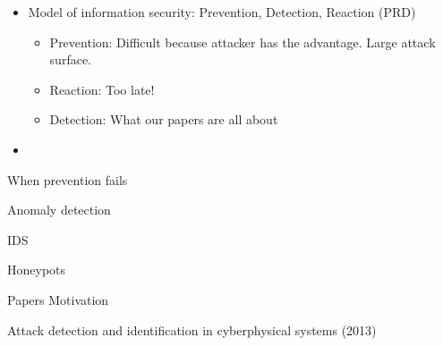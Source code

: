 \documentclass[compress]{beamer}
\begin{document}
\begin{frame}
    \begin{itemize}
        \item Model of information security: Prevention, Detection, Reaction
            (PRD)
            \begin{itemize}
                \item Prevention: Difficult because attacker has the advantage.
                    Large attack surface.


                \item
                    Reaction: Too late!
                \item
                    Detection: What our papers are all about
            \end{itemize}
        \item

    \end{itemize}
\end{frame}
\begin{frame}{When prevention fails}

\end{frame}
\begin{frame}{Anomaly detection}

\end{frame}
\begin{frame}{IDS}

\end{frame}
\begin{frame}{Honeypots}

\end{frame}
\begin{frame}{Papers}
    Motivation
\end{frame}
\begin{frame}{Attack detection and identification in cyberphysical systems
    (2013)}

\end{frame}
\end{document}
